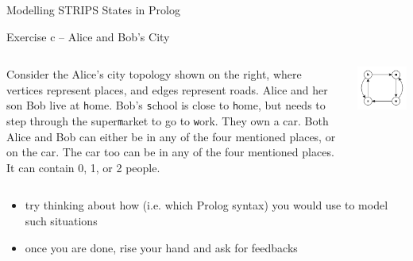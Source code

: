 \documentclass[presentation]{beamer}\mode<presentation>{\usetheme{AMSBolognaFC}}
\begin{document}
\begin{frame}[allowframebreaks]{Modelling STRIPS States in Prolog}
\begin{block}{Exercise \currentExercise{}c -- Alice and Bob's City}
    \begin{columns}
        \begin{column}{.7\linewidth}
            Consider the Alice's city topology shown on the right, where vertices represent places, and edges represent roads.
            Alice and her son Bob live at \alert{\texttt{h}}ome.
            Bob's \alert{\texttt{s}}chool is close to \alert{\texttt{h}}ome, but needs to step through the super\alert{\texttt{m}}arket to go to \alert{\texttt{w}}ork.
            They own a car.
            Both Alice and Bob can either be in any of the four mentioned places, or on the car.
            The car too can be in any of the four mentioned places.
            It can contain 0, 1, or 2 people.
        \end{column}
        \begin{column}{.3\linewidth}
            \includegraphics[width=\linewidth]{./figures/city.pdf}
        \end{column}
    \end{columns}
\end{block}

\begin{itemize}
    \item try thinking about \alert{how} (i.e. which Prolog syntax) you would use to model such situations

    \item once you are done, rise your hand and ask for feedbacks
\end{itemize}
\end{frame}
\end{document}
